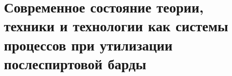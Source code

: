 \chapter{Современное состояние теории, техники и технологии как системы процессов при утилизации послеспиртовой барды}

%

%

%












